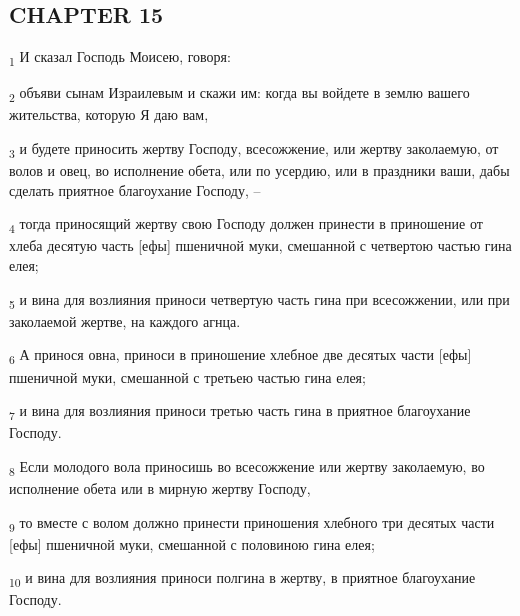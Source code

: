 \subsection{CHAPTER 15}
\begin{tcolorbox}
\textsubscript{1} И сказал Господь Моисею, говоря:
\end{tcolorbox}
\begin{tcolorbox}
\textsubscript{2} объяви сынам Израилевым и скажи им: когда вы войдете в землю вашего жительства, которую Я даю вам,
\end{tcolorbox}
\begin{tcolorbox}
\textsubscript{3} и будете приносить жертву Господу, всесожжение, или жертву заколаемую, от волов и овец, во исполнение обета, или по усердию, или в праздники ваши, дабы сделать приятное благоухание Господу, --
\end{tcolorbox}
\begin{tcolorbox}
\textsubscript{4} тогда приносящий жертву свою Господу должен принести в приношение от хлеба десятую часть [ефы] пшеничной муки, смешанной с четвертою частью гина елея;
\end{tcolorbox}
\begin{tcolorbox}
\textsubscript{5} и вина для возлияния приноси четвертую часть гина при всесожжении, или при заколаемой жертве, на каждого агнца.
\end{tcolorbox}
\begin{tcolorbox}
\textsubscript{6} А принося овна, приноси в приношение хлебное две десятых части [ефы] пшеничной муки, смешанной с третьею частью гина елея;
\end{tcolorbox}
\begin{tcolorbox}
\textsubscript{7} и вина для возлияния приноси третью часть гина в приятное благоухание Господу.
\end{tcolorbox}
\begin{tcolorbox}
\textsubscript{8} Если молодого вола приносишь во всесожжение или жертву заколаемую, во исполнение обета или в мирную жертву Господу,
\end{tcolorbox}
\begin{tcolorbox}
\textsubscript{9} то вместе с волом должно принести приношения хлебного три десятых части [ефы] пшеничной муки, смешанной с половиною гина елея;
\end{tcolorbox}
\begin{tcolorbox}
\textsubscript{10} и вина для возлияния приноси полгина в жертву, в приятное благоухание Господу.
\end{tcolorbox}
